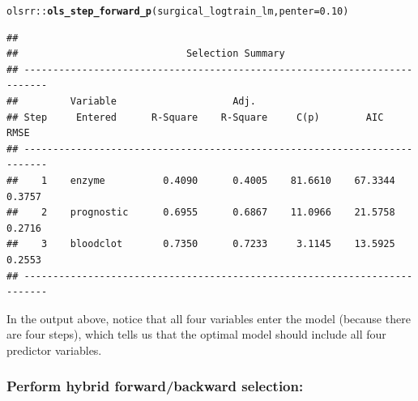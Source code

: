 \documentclass{article}\usepackage[]{graphicx}\usepackage[]{color}
\makeatletter
\newcommand{\hlnum}[1]{\textcolor[rgb]{0.686,0.059,0.569}{#1}}%
\newcommand{\hlopt}[1]{\textcolor[rgb]{0,0,0}{#1}}%
\newcommand{\hlstd}[1]{\textcolor[rgb]{0.345,0.345,0.345}{#1}}%
\newcommand{\hlkwc}[1]{\textcolor[rgb]{0.333,0.667,0.333}{#1}}%
\newcommand{\hlkwd}[1]{\textcolor[rgb]{0.737,0.353,0.396}{\textbf{#1}}}%
\newenvironment{kframe}{%
 \def\at@end@of@kframe{}%
 \ifinner\ifhmode%
  \def\at@end@of@kframe{\end{minipage}}%
  \begin{minipage}{\columnwidth}%
 \fi\fi%
 \def\FrameCommand##1{\hskip\@totalleftmargin \hskip-\fboxsep
 \colorbox{shadecolor}{##1}\hskip-\fboxsep
     \hskip-\linewidth \hskip-\@totalleftmargin \hskip\columnwidth}%
 \MakeFramed {\advance\hsize-\width
   \@totalleftmargin\z@ \linewidth\hsize
   \@setminipage}}%
 {\par\unskip\endMakeFramed%
 \at@end@of@kframe}
\newenvironment{knitrout}{}{} %
\makeatother
\begin{document}
\begin{knitrout}
\color{fgcolor}\begin{kframe}
\begin{alltt}
\hlstd{olsrr}\hlopt{::}\hlkwd{ols_step_forward_p}\hlstd{(surgical_logtrain_lm,} \hlkwc{penter} \hlstd{=} \hlnum{0.10}\hlstd{)}
\end{alltt}
\begin{verbatim}
## 
##                             Selection Summary                              
## --------------------------------------------------------------------------
##         Variable                    Adj.                                      
## Step     Entered      R-Square    R-Square     C(p)        AIC       RMSE     
## --------------------------------------------------------------------------
##    1    enzyme          0.4090      0.4005    81.6610    67.3344    0.3757    
##    2    prognostic      0.6955      0.6867    11.0966    21.5758    0.2716    
##    3    bloodclot       0.7350      0.7233     3.1145    13.5925    0.2553    
## --------------------------------------------------------------------------
\end{verbatim}
\end{kframe}
\end{knitrout}

In the output above, notice that all four variables enter the model (because there are four steps), which tells us that the optimal model should include all four predictor variables.

\subsubsection*{Perform hybrid forward/backward selection:}
\end{document}
